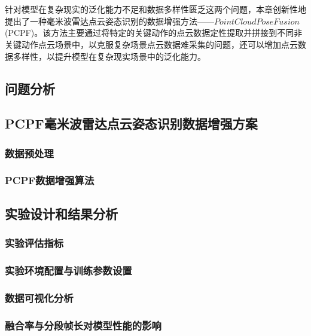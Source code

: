 \chapter{}
针对模型在复杂现实的泛化能力不足和数据多样性匮乏这两个问题，本章创新性地提出了一种毫米波雷达点云姿态识别的数据增强方法——$PointCloud PoseFusion$(PCPF)。该方法主要通过将特定的关键动作的点云数据定性提取并拼接到不同非关键动作点云场景中，以克服复杂场景点云数据难采集的问题，还可以增加点云数据多样性，以提升模型在复杂现实场景中的泛化能力。


\section{问题分析}
\section{PCPF毫米波雷达点云姿态识别数据增强方案}

\subsection{数据预处理}
\subsection{PCPF数据增强算法}



\section{实验设计和结果分析}
\subsection{实验评估指标}
\subsection{实验环境配置与训练参数设置}
\subsection{数据可视化分析}
\subsection{融合率与分段帧长对模型性能的影响}

